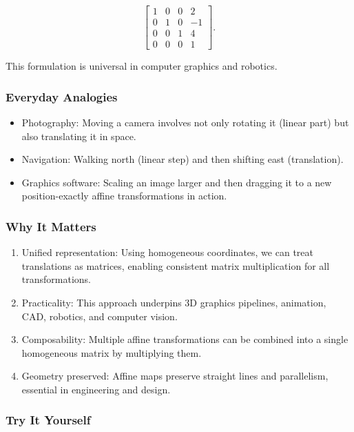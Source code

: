 \documentclass[
  letterpaper,
  DIV=11,
  numbers=noendperiod]{scrreprt}
\providecommand{\tightlist}{%
  \setlength{\itemsep}{0pt}\setlength{\parskip}{0pt}}
\begin{document}
\[
\begin{bmatrix} 
1 & 0 & 0 & 2 \\ 
0 & 1 & 0 & -1 \\ 
0 & 0 & 1 & 4 \\ 
0 & 0 & 0 & 1 
\end{bmatrix}.
\]

This formulation is universal in computer graphics and robotics.

\subsubsection{Everyday Analogies}\label{everyday-analogies-15}

\begin{itemize}
\tightlist
\item
  Photography: Moving a camera involves not only rotating it (linear
  part) but also translating it in space.
\item
  Navigation: Walking north (linear step) and then shifting east
  (translation).
\item
  Graphics software: Scaling an image larger and then dragging it to a
  new position-exactly affine transformations in action.
\end{itemize}

\subsubsection{Why It Matters}\label{why-it-matters-15}

\begin{enumerate}
\def\labelenumi{\arabic{enumi}.}
\tightlist
\item
  Unified representation: Using homogeneous coordinates, we can treat
  translations as matrices, enabling consistent matrix multiplication
  for all transformations.
\item
  Practicality: This approach underpins 3D graphics pipelines,
  animation, CAD, robotics, and computer vision.
\item
  Composability: Multiple affine transformations can be combined into a
  single homogeneous matrix by multiplying them.
\item
  Geometry preserved: Affine maps preserve straight lines and
  parallelism, essential in engineering and design.
\end{enumerate}

\subsubsection{Try It Yourself}\label{try-it-yourself-18}
\end{document}
